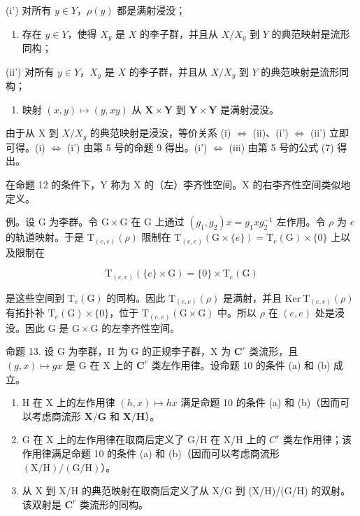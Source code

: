 (i') 对所有 \(y \in Y\)，\(\rho(y)\) 都是满射浸没；

\begin{enumerate}
\def\labelenumi{(\roman{enumi})}
\setcounter{enumi}{1}
\tightlist
\item
  存在 \(y \in Y\)，使得 \(X_y\) 是 \(X\) 的李子群，并且从 \(X / X_y\) 到 \(Y\) 的典范映射是流形同构；
\end{enumerate}

(ii') 对所有 \(y \in Y\)，\(X_y\) 是 \(X\) 的李子群，并且从 \(X / X_y\) 到 \(Y\) 的典范映射是流形同构；

\begin{enumerate}
\def\labelenumi{(\roman{enumi})}
\setcounter{enumi}{2}
\tightlist
\item
  映射 \((x,y)\mapsto (y,xy)\) 从 \(\mathbf{X}\times \mathbf{Y}\) 到 \(\mathbf{Y}\times \mathbf{Y}\) 是满射浸没。
\end{enumerate}

由于从 X 到 \(X/X_{y}\) 的典范映射是浸没，等价关系 (i) \(\Leftrightarrow\) (ii)、(i') \(\Leftrightarrow\) (ii') 立即可得。(i) \(\Leftrightarrow\) (i') 由第 5 号的命题 9 得出。(i') \(\Leftrightarrow\) (iii) 由第 5 号的公式 (7) 得出。

在命题 12 的条件下，Y 称为 X 的（左）李齐性空间。X 的右李齐性空间类似地定义。

例。设 \(\mathrm{G}\) 为李群。令 \(\mathrm{G} \times \mathrm{G}\) 在 \(\mathrm{G}\) 上通过 \((g_1, g_2)x = g_1xg_2^{-1}\) 左作用。令 \(\rho\) 为 \(e\) 的轨道映射。于是 \(\mathrm{T}_{(e,e)}(\rho)\) 限制在 \(\mathrm{T}_{(e,e)}(\mathrm{G} \times \{e\}) = \mathrm{T}_e(\mathrm{G}) \times \{0\}\) 上以及限制在

\[
\mathrm{T} _ {(e, e)} (\{e \} \times \mathrm{G}) = \{0 \} \times \mathrm{T} _ {e} (\mathrm{G})
\]

是这些空间到 \(\mathrm{T}_{e}(\mathrm{G})\) 的同构。因此 \(\mathrm{T}_{(e,e)}(\rho)\) 是满射，并且 \(\mathrm{Ker~T}_{(e,e)}(\rho)\) 有拓扑补 \(\mathrm{T}_{e}(\mathrm{G}) \times \{0\}\)，位于 \(\mathrm{T}_{(e,e)}(\mathrm{G} \times \mathrm{G})\) 中。所以 \(\rho\) 在 \((e,e)\) 处是浸没。因此 G 是 \(\mathrm{G} \times \mathrm{G}\) 的左李齐性空间。

命题 13. 设 G 为李群，H 为 G 的正规李子群，X 为 \(\mathbf{C}^r\) 类流形，且 \((g,x)\mapsto gx\) 是 G 在 X 上的 \(\mathbf{C}^r\) 类左作用律。设命题 10 的条件 (a) 和 (b) 成立。

\begin{enumerate}
\def\labelenumi{(\roman{enumi})}
\item
  H 在 X 上的左作用律 \((h, x) \mapsto hx\) 满足命题 10 的条件 (a) 和 (b)（因而可以考虑商流形 \(\mathbf{X} / \mathbf{G}\) 和 \(\mathbf{X} / \mathbf{H}\)）。
\item
  G 在 X 上的左作用律在取商后定义了 G/H 在 X/H 上的 \(C^{r}\) 类左作用律；该作用律满足命题 10 的条件 (a) 和 (b)（因而可以考虑商流形 \((\mathrm{X}/\mathrm{H})/(\mathrm{G}/\mathrm{H})\)）。
\item
  从 X 到 X/H 的典范映射在取商后定义了从 X/G 到 (X/H)/(G/H) 的双射。该双射是 \(\mathbf{C}^r\) 类流形的同构。
\end{enumerate}

